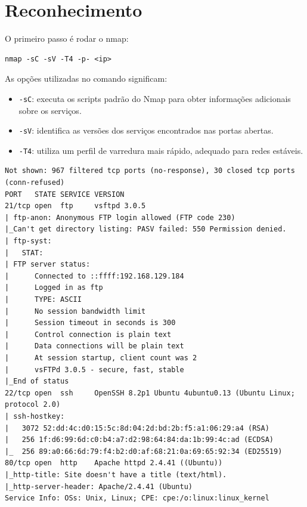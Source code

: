 \documentclass[12pt]{article} %
\begin{document}
\section{Reconhecimento}

O primeiro passo é rodar o nmap:

\begin{lstlisting}[caption={Explorando o ip com nmap}]
nmap -sC -sV -T4 -p- <ip>
\end{lstlisting}

As opções utilizadas no comando significam:

\begin{itemize}
    \item \texttt{-sC}: executa os scripts padrão do Nmap para obter informações adicionais sobre os serviços.
    \item \texttt{-sV}: identifica as versões dos serviços encontrados nas portas abertas.
    \item \texttt{-T4}: utiliza um perfil de varredura mais rápido, adequado para redes estáveis.
\end{itemize}

\begin{lstlisting}[caption={Resultado do nmap}]
Not shown: 967 filtered tcp ports (no-response), 30 closed tcp ports (conn-refused)
PORT   STATE SERVICE VERSION
21/tcp open  ftp     vsftpd 3.0.5
| ftp-anon: Anonymous FTP login allowed (FTP code 230)
|_Can't get directory listing: PASV failed: 550 Permission denied.
| ftp-syst: 
|   STAT: 
| FTP server status:
|      Connected to ::ffff:192.168.129.184
|      Logged in as ftp
|      TYPE: ASCII
|      No session bandwidth limit
|      Session timeout in seconds is 300
|      Control connection is plain text
|      Data connections will be plain text
|      At session startup, client count was 2
|      vsFTPd 3.0.5 - secure, fast, stable
|_End of status
22/tcp open  ssh     OpenSSH 8.2p1 Ubuntu 4ubuntu0.13 (Ubuntu Linux; protocol 2.0)
| ssh-hostkey: 
|   3072 52:dd:4c:d0:15:5c:8d:04:2d:bd:2b:f5:a1:06:29:a4 (RSA)
|   256 1f:d6:99:6d:c0:b4:a7:d2:98:64:84:da:1b:99:4c:ad (ECDSA)
|_  256 89:a0:66:6d:79:f4:b2:d0:af:68:21:0a:69:65:92:34 (ED25519)
80/tcp open  http    Apache httpd 2.4.41 ((Ubuntu))
|_http-title: Site doesn't have a title (text/html).
|_http-server-header: Apache/2.4.41 (Ubuntu)
Service Info: OSs: Unix, Linux; CPE: cpe:/o:linux:linux_kernel
\end{lstlisting}
\end{document}
